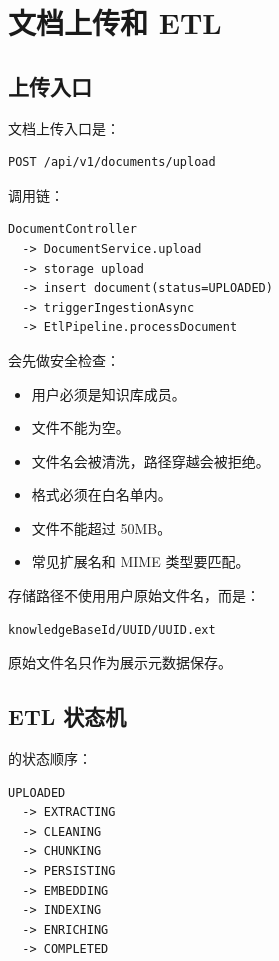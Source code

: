 \documentclass[UTF8,zihao=-4]{ctexart}
\begin{document}
\section{文档上传和 ETL}

\subsection{上传入口}

文档上传入口是：

\begin{lstlisting}[style=code]
POST /api/v1/documents/upload
\end{lstlisting}

调用链：

\begin{lstlisting}[style=code]
DocumentController
  -> DocumentService.upload
  -> storage upload
  -> insert document(status=UPLOADED)
  -> triggerIngestionAsync
  -> EtlPipeline.processDocument
\end{lstlisting}

 会先做安全检查：

\begin{itemize}
  \item 用户必须是知识库成员。
  \item 文件不能为空。
  \item 文件名会被清洗，路径穿越会被拒绝。
  \item 格式必须在白名单内。
  \item 文件不能超过 50MB。
  \item 常见扩展名和 MIME 类型要匹配。
\end{itemize}

存储路径不使用用户原始文件名，而是：

\begin{lstlisting}[style=code]
knowledgeBaseId/UUID/UUID.ext
\end{lstlisting}

原始文件名只作为展示元数据保存。

\subsection{ETL 状态机}

 的状态顺序：

\begin{lstlisting}[style=code]
UPLOADED
  -> EXTRACTING
  -> CLEANING
  -> CHUNKING
  -> PERSISTING
  -> EMBEDDING
  -> INDEXING
  -> ENRICHING
  -> COMPLETED
\end{lstlisting}
\end{document}
